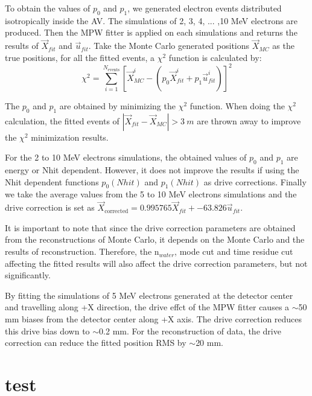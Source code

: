 To obtain the values of $p_0$ and $p_1$, we generated electron events distributed isotropically inside the AV. The simulations of 2, 3, 4, ... ,10 MeV electrons are produced. Then the MPW fitter is applied on each simulations and returns the results of $\vec{X}_{fit}$ and $\vec{u}_{fit}$. Take the Monte Carlo generated positions $\vec{X}_{MC}$ as the true positions, for all the fitted events, a $\chi^2$ function is calculated by:
\[
\chi^2 = \sum_{i=1}^{N_{\mathrm{events}}}[\vec{X}^i_{MC}-(p_0\vec{X}^i_{fit}+p_1\vec{u}^i_{fit})]^2
\]

The $p_0$ and $p_1$ are obtained by minimizing the $\chi^2$ function. 
When doing the $\chi^2$ calculation, the fitted events of $|\vec{X}_{fit}-\vec{X}_{MC}|>3~m$ are thrown away to improve the $\chi^2$ minimization results.

For the 2 to 10 MeV electrons simulations, the obtained values of $p_0$ and $p_1$ are energy or Nhit dependent. However, it does not improve the results if using the Nhit dependent functions $p_0(Nhit)$ and $p_1(Nhit)$ as drive corrections.
Finally we take the average values from the 5 to 10 MeV electrons simulations and the drive correction is set as $\vec{X}_{\mathrm{corrected}} = 0.995765\vec{X}_{fit}+-63.826\vec{u}_{fit}$.

It is important to note that since the drive correction parameters are obtained from the reconstructions of Monte Carlo, it depends on the Monte Carlo and the results of reconstruction. Therefore, the n$_{water}$, mode cut and time residue cut affecting the fitted results will also affect the drive correction parameters, but not significantly.

By fitting the simulations of 5 MeV electrons generated at the detector center and travelling along +X direction, the drive effct of the MPW fitter causes a $\sim$50 mm biases from the detector center along +X axis. The drive correction reduces this drive bias down to $\sim$0.2 mm. For the reconstruction of  data, the drive correction can reduce the fitted position RMS by $\sim$20 mm.













\section{ test}

